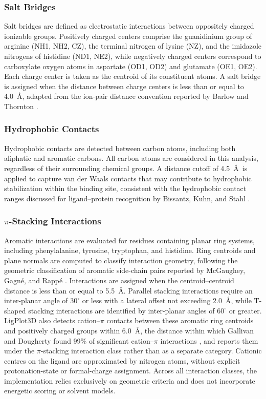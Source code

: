 \documentclass[journal=jacsat,manuscript=article]{achemso}
\begin{document}
\subsubsection{Salt Bridges}
Salt bridges are defined as electrostatic interactions between oppositely charged ionizable groups. Positively charged centers comprise the guanidinium group of arginine (NH1, NH2, CZ), the terminal nitrogen of lysine (NZ), and the imidazole nitrogens of histidine (ND1, NE2), while negatively charged centers correspond to carboxylate oxygen atoms in aspartate (OD1, OD2) and glutamate (OE1, OE2). Each charge center is taken as the centroid of its constituent atoms. A salt bridge is assigned when the distance between charge centers is less than or equal to 4.0~\AA, adapted from the ion-pair distance convention reported by Barlow and Thornton \cite{barlow1983ion}.

\subsubsection{Hydrophobic Contacts}
Hydrophobic contacts are detected between carbon atoms, including both aliphatic and aromatic carbons. All carbon atoms are considered in this analysis, regardless of their surrounding chemical groups. A distance cutoff of 4.5~\AA\ is applied to capture van der Waals contacts that may contribute to hydrophobic stabilization within the binding site, consistent with the hydrophobic contact ranges discussed for ligand--protein recognition by Bissantz, Kuhn, and Stahl \cite{bissantz2010medicinal}.


\subsubsection{$\pi$-Stacking Interactions}
Aromatic interactions are evaluated for residues containing planar ring systems, including phenylalanine, tyrosine, tryptophan, and histidine. Ring centroids and plane normals are computed to classify interaction geometry, following the geometric classification of aromatic side-chain pairs reported by McGaughey, Gagn\'e, and Rapp\'e \cite{mcgaughey1998pi}. Interactions are assigned when the centroid–centroid distance is less than or equal to 5.5~\AA. Parallel stacking interactions require an inter-planar angle of $30^{\circ}$ or less with a lateral offset not exceeding 2.0~\AA, while T-shaped stacking interactions are identified by inter-planar angles of $60^{\circ}$ or greater. LigPlot3D also detects cation–$\pi$ contacts between these aromatic ring centroids and positively charged groups within 6.0~\AA, the distance within which Gallivan and Dougherty found 99\% of significant cation–$\pi$ interactions \cite{gallivan1999cation}, and reports them under the $\pi$-stacking interaction class rather than as a separate category. Cationic centres on the ligand are approximated by nitrogen atoms, without explicit protonation-state or formal-charge assignment. Across all interaction classes, the implementation relies exclusively on geometric criteria and does not incorporate energetic scoring or solvent models.
\end{document}
